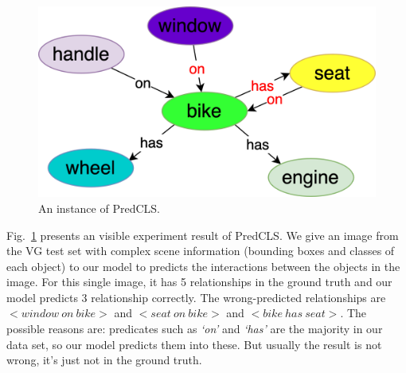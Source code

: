 \begin{figure}[H]
{\begin{minipage}[t]{4.5cm}
			\centering
			\includegraphics[width=0.8\linewidth]{figures/result/predcls/rec}
	\end{minipage}}
	
	\caption[An instance of PredCLS]{An instance of PredCLS.}
	\label{fig:predcls}
\end{figure}
Fig.~\ref{fig:predcls} presents an visible experiment result of PredCLS. We give an image from the VG test set with complex scene information (bounding boxes and classes of each object) to our  model to predicts the interactions between the objects in the image. For this single image, it has 5 relationships in the ground truth and our model predicts 3 relationship correctly. The wrong-predicted relationships are $ <window\ on\ bike >$ and $<seat\ on\ bike>$ and $<bike\ has\ seat>$. The possible reasons are: predicates such as \textit{`on' }and \textit{`has' } are the majority in our data set, so our model predicts them into these. But usually the result is not wrong, it's just not in the ground truth.


